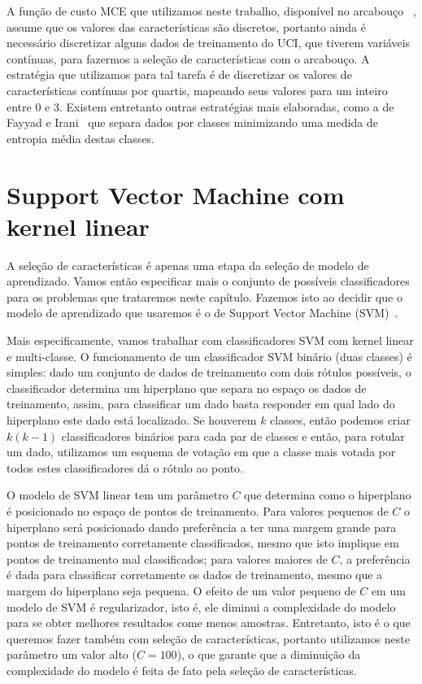 A função de custo MCE que utilizamos neste trabalho, disponível no
arcabouço ~\cite{Reis+17}, assume que os valores
das características são discretos, portanto ainda é necessário 
discretizar alguns dados de treinamento do UCI, que tiverem variáveis 
contínuas, para fazermos a seleção de características com o arcabouço.
A estratégia que utilizamos para tal tarefa é de 
discretizar os valores de características contínuas por quartis, 
mapeando seus valores para um inteiro entre 0 e 3. Existem entretanto 
outras estratégias mais elaboradas, como a de Fayyad e Irani~\cite{FI93}
que separa dados por classes minimizando uma medida de entropia média 
destas classes.

\section{Support Vector Machine com kernel linear}
\label{sec:real_instances:svm}
A seleção de características é apenas uma etapa da seleção de modelo
de aprendizado. Vamos então especificar mais o conjunto de possíveis
classificadores para os problemas que trataremos neste capítulo. Fazemos
isto ao decidir que o modelo de aprendizado que usaremos é o de
Support Vector Machine (SVM)~\cite{CL11}.

Mais especificamente, vamos trabalhar com classificadores SVM com kernel
linear e multi-classe. O funcionamento de um classificador SVM binário
(duas classes) é simples: dado um conjunto de dados de treinamento com 
dois rótulos possíveis, o classificador determina um hiperplano que 
separa no espaço os dados de treinamento, assim, para classificar um 
dado basta responder em qual lado do hiperplano este dado está 
localizado. Se houverem $k$ classes, então podemos criar $k(k-1)$ 
classificadores binários para cada par de classes e então, para rotular 
um dado, utilizamos um esquema de votação em que a classe mais votada 
por todos estes classificadores dá o rótulo ao ponto.

O modelo de SVM linear tem um parâmetro $C$ que determina como o 
hiperplano é posicionado no espaço de pontos de treinamento. Para 
valores pequenos de $C$ o hiperplano será posicionado dando preferência
a ter uma margem grande para pontos de treinamento corretamente 
classificados, mesmo que isto implique em pontos de treinamento mal 
classificados; para valores maiores de $C$, a preferência é dada para 
classificar corretamente os dados de treinamento, mesmo que a margem do
hiperplano seja pequena. O efeito de um valor pequeno de $C$ em um 
modelo de SVM é regularizador, isto é, ele diminui a complexidade do
modelo para se obter melhores resultados come menos amostras. 
Entretanto, isto é o que queremos fazer também com seleção de 
características, portanto utilizamos neste parâmetro um valor alto 
($C = 100$), o que garante que a diminuição da complexidade do modelo é 
feita de fato pela seleção de características.

